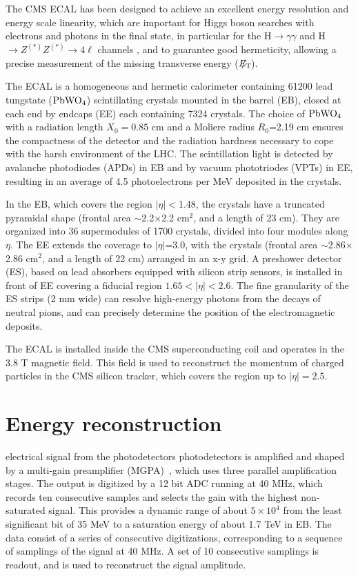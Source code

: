 \documentclass[journal]{IEEEtran}
\newcommand{\ETslash}{\ensuremath{E_{\mathrm{T}}\hspace{-1.1em}/\kern0.45em}}
\begin{document}
The CMS ECAL \cite{CMS:1997ema} has been designed to achieve an excellent energy resolution and energy scale linearity, which are important for Higgs boson searches with electrons and photons in the final state, in particular for the H$\to\gamma\gamma$ \cite{Khachatryan:2014ira} and H$\to Z^{(\ast)}Z^{(\ast)}\to 4\ell$ channels \cite{Chatrchyan:2013mxa}, and to guarantee good hermeticity, allowing a precise measurement of the missing transverse energy ($\ETslash$).

The ECAL is a homogeneous and hermetic calorimeter containing 61200 lead tungstate ($\rm PbWO_4$) scintillating crystals mounted in the barrel (EB), closed at each end by endcaps (EE) each containing 7324 crystals. The choice of $\rm PbWO_4$ with a radiation length $X_0=0.85$ cm and a Moliere radius $R_0$=2.19 cm ensures the compactness of the detector and the radiation hardness necessary to cope with the harsh environment of the LHC. The scintillation light is detected by avalanche photodiodes (APDs) in EB and by vacuum phototriodes (VPTs) in EE, resulting in an average of 4.5 photoelectrons per MeV deposited in the crystals. 

In the EB, which covers the region $\vert\eta\vert<$1.48, the crystals have a truncated pyramidal shape (frontal area $\sim$2.2$\times$2.2 cm$^2$, and a length of 23 cm). They are organized into 36 supermodules of 1700 crystals, divided into four modules along $\eta$. The EE extends the coverage to $\vert\eta\vert$=3.0, with the crystals (frontal area $\sim$2.86$\times$2.86 cm$^2$, and a length of 22 cm) arranged in an x-y grid. A preshower detector (ES), based on lead absorbers equipped with silicon strip sensors, is installed in front of EE covering a fiducial region $1.65<\vert\eta\vert<2.6$. The fine granularity of the ES strips (2 mm wide) can resolve high-energy photons from the decays of neutral pions, and can precisely determine the position of the electromagnetic deposits.

The ECAL is installed inside the CMS superconducting coil and operates in the 3.8 T magnetic field. This field is used to reconstruct the momentum of charged particles in the CMS silicon tracker, which covers the region up to $\vert\eta\vert=2.5$.



\section{Energy reconstruction}
\label{sec:energyreco}
 electrical signal from the photodetectors photodetectors is amplified and shaped by a multi-gain preamplifier (MGPA)~\cite{Raymond:2005jm}, which uses three parallel amplification stages. The output is digitized by a 12 bit ADC running at 40 MHz, which records ten consecutive samples and selects the gain with the highest non-saturated signal. This provides a dynamic range of about $5 \times 10^4$ from the least significant bit of 35 MeV to a saturation energy of about 1.7 TeV in EB. The data consist of a series of consecutive digitizations, corresponding to a sequence of samplings of the signal at 40 MHz. A set of 10 consecutive samplings is readout, and is used to reconstruct the signal amplitude.
\end{document}
